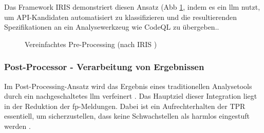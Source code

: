 \documentclass[%
    paper=A4,               %
    ngerman,
    parskip=half,           %
    11pt,                   %
    headings=normal,        %
    bibliography=totoc,     %
    listof=totoc,           %
    chapterprefix=false,    %
    appendixprefix=false,    %
    draft=false,            %
]{scrartcl}%
\begin{document}
Das Framework  IRIS demonstriert diesen Ansatz (Abb \ref{fig:pre_processing_pattern}, indem es ein \ac{llm} nutzt, um API-Kandidaten automatisiert zu klassifizieren und die resultierenden Spezifikationen an ein Analysewerkzeug wie CodeQL zu übergeben.\cite{liIRISLLMAssistedStatic2024}.

\begin{figure}[h]
\centering
\caption{Vereinfachtes Pre-Processing (nach IRIS \cite{liIRISLLMAssistedStatic2024})}
\label{fig:pre_processing_pattern}
\end{figure}

\subsubsection{Post-Processor - Verarbeitung von Ergebnissen}
Im Post-Processing-Ansatz wird das Ergebnis eines traditionellen Analysetools durch ein nachgeschaltetes \ac{llm} verfeinert \cite{wagnerEffectiveComplementarySecurity2025}. Das Hauptziel dieser Integration liegt in der Reduktion der \ac{fp}-Meldungen. Dabei ist ein Aufrechterhalten der \ac{TPR} essentiell, um sicherzustellen, dass keine Schwachstellen als harmlos eingestuft werden \cite{wagnerEffectiveComplementarySecurity2025}.
\end{document}
